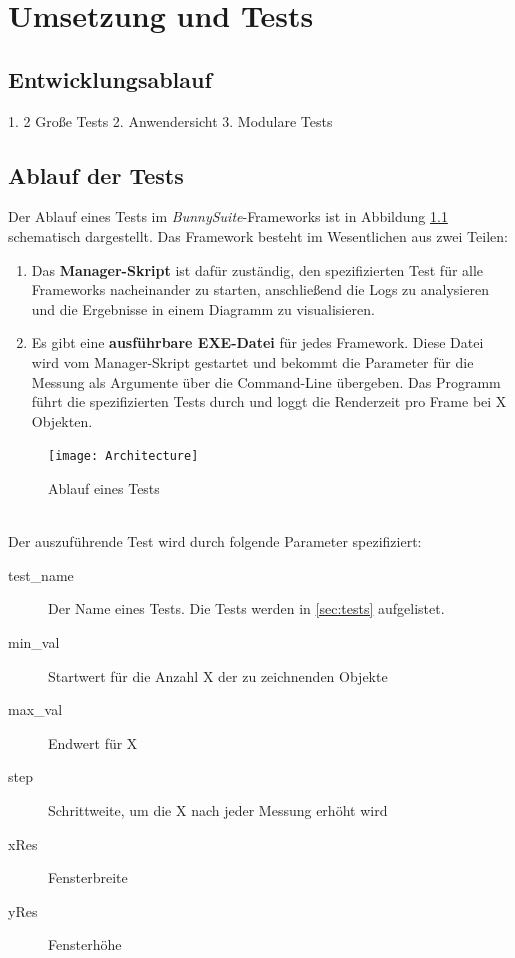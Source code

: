 \chapter{Umsetzung und Tests}
\section{Entwicklungsablauf}
1. 2 Große Tests
2. Anwendersicht
3. Modulare Tests


\section{Ablauf der Tests}
Der Ablauf eines Tests im \textit{BunnySuite}-Frameworks ist in Abbildung \ref{dia:architecture} schematisch dargestellt. Das Framework besteht im Wesentlichen aus zwei Teilen:
\begin{enumerate}
\item Das \textbf{Manager-Skript} ist dafür zuständig, den spezifizierten Test für alle Frameworks nacheinander zu starten, anschließend die Logs zu analysieren und die Ergebnisse in einem Diagramm zu visualisieren.
\item Es gibt eine \textbf{ausführbare EXE-Datei} für jedes Framework. Diese Datei wird vom Manager-Skript gestartet und bekommt die Parameter für die Messung als Argumente über die Command-Line übergeben. Das Programm führt die spezifizierten Tests durch und loggt die Renderzeit pro Frame bei X Objekten.
\end{enumerate}
\begin{figure}[h]
\caption{Ablauf eines Tests}
\centering
\texttt{[image: Architecture]}
\label{dia:architecture}
\end{figure}
~\\
Der auszuführende Test wird durch folgende Parameter spezifiziert:\\
\begin{description}
\item[test\_name] Der Name eines Tests. Die Tests werden in \ref{sec:tests} aufgelistet.
\item[min\_val] Startwert für die Anzahl X der zu zeichnenden Objekte
\item[max\_val] Endwert für X
\item[step] Schrittweite, um die X nach jeder Messung erhöht wird
\item[xRes] Fensterbreite
\item[yRes] Fensterhöhe
\end{description}

